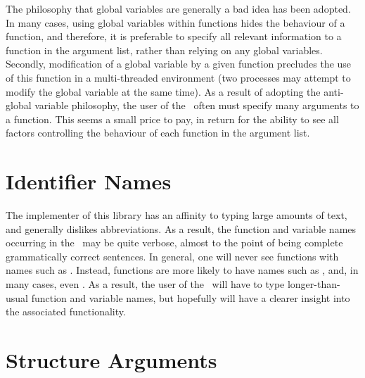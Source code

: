 The philosophy that global variables are generally a bad idea has been
adopted.  In many cases, using global variables within functions
hides the behaviour of a function, and therefore,
it is preferable to specify all relevant information to
a function in the argument list, rather than relying on any global
variables.  Secondly, modification of a global variable by a given function
precludes the use of this function in a multi-threaded environment
(two processes may attempt to modify the global variable at the same
time).  As a result of adopting the anti-global variable philosophy, the
user of the \vol\  often must specify
many arguments to a function.  This seems a small price to pay, in
return for the ability to see all factors controlling
the behaviour of each function in the argument list.

\section{Identifier Names}

The implementer of this library has an affinity to typing large
amounts of text, and generally dislikes abbreviations.  As a result,
the function and variable names occurring in the \vol\  may
be quite verbose, almost to the point of being complete grammatically
correct sentences.  In general, one will never see functions with names
such as .  Instead, functions are more likely to have
names such as , and, in many cases, even
.  As a result, the user of the
\vol\ will have to type longer-than-usual function and variable
names, but hopefully will have a clearer insight into the associated
functionality.

\section{Structure Arguments}

